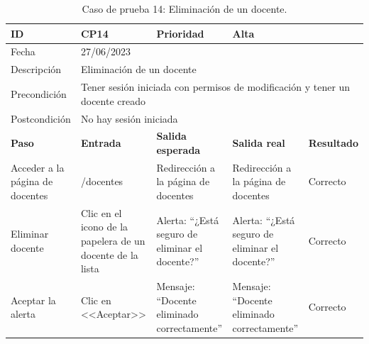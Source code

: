 \begin{table}[H]
\small
\begin{tabular}{p{} p{} p{} p{} p{}}
\cellcolor{gray!25}
ID   & CP14 & \cellcolor{gray!25} Prioridad   & Alta \\ \hline
\cellcolor{gray!25} Fecha	&	\multicolumn{4}{l}{27/06/2023} \\ \hline
\cellcolor{gray!25} Descripción		&	\multicolumn{4}{l}{Eliminación de un docente} \\ \hline                                            
\cellcolor{gray!25}
Precondición  & \multicolumn{4}{p{.66\textwidth}}{Tener sesión iniciada con permisos de modificación y tener un docente creado} \\ \hline
\cellcolor{gray!25} Postcondición & \multicolumn{4}{l}{No hay sesión iniciada}                                                    \\ \hline
\rowcolor{gray!25}
\textbf{Paso}   & \textbf{Entrada} & \textbf{Salida esperada} & \textbf{Salida real} & \textbf{Resultado} \\ \hline
Acceder a la página de docentes 
& /docentes                                                                          
& Redirección a la página de docentes                                   
& Redirección a la página de docentes                                   
& Correcto                            
\\ \hline
Eliminar docente
& Clic en el icono de la papelera de un docente de la lista
& Alerta: ``¿Está seguro de eliminar el docente?''
& Alerta: ``¿Está seguro de eliminar el docente?''
& Correcto
\\ \hline
Aceptar la alerta
& Clic en <<Aceptar>>
& Mensaje: ``Docente eliminado correctamente''                      
& Mensaje: ``Docente eliminado correctamente''   
& Correcto                            
\\ \hline              
\end{tabular}
\caption{Caso de prueba 14: Eliminación de un docente.}\label{table:CP14}
\end{table}


